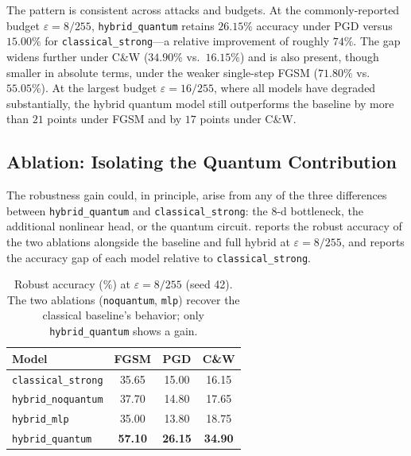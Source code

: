 \documentclass[11pt]{article}
\newcommand{\eps}{\varepsilon}
\begin{document}
The pattern is consistent across attacks and budgets. At the
commonly-reported budget $\eps = 8/255$, \texttt{hybrid\_quantum} retains
$26.15\%$ accuracy under PGD versus $15.00\%$ for
\texttt{classical\_strong}---a relative improvement of roughly $74\%$.
The gap widens further under C\&W ($34.90\%$ vs.\ $16.15\%$) and is also
present, though smaller in absolute terms, under the weaker single-step
FGSM ($71.80\%$ vs.\ $55.05\%$). At the largest budget
$\eps = 16/255$, where all models have degraded substantially, the hybrid
quantum model still outperforms the baseline by more than $21$ points
under FGSM and by $17$ points under C\&W.

\subsection{Ablation: Isolating the Quantum Contribution}
\label{sec:exp:ablation}

The robustness gain could, in principle, arise from any of the three
differences between \texttt{hybrid\_quantum} and
\texttt{classical\_strong}: the 8-d bottleneck, the additional nonlinear
head, or the quantum circuit.  reports the robust
accuracy of the two ablations alongside the baseline and full hybrid at
$\eps = 8/255$, and  reports the accuracy gap
of each model relative to \texttt{classical\_strong}.

\begin{table}[t]
\centering
\caption{Robust accuracy (\%) at $\eps = 8/255$ (seed 42). The two
ablations (\texttt{noquantum}, \texttt{mlp}) recover the classical
baseline's behavior; only \texttt{hybrid\_quantum} shows a gain.}
\label{tab:ablation}
\begin{tabular}{lccc}
\toprule
Model & FGSM & PGD & C\&W \\
\midrule
\texttt{classical\_strong}    & 35.65 & 15.00 & 16.15 \\
\texttt{hybrid\_noquantum}    & 37.70 & 14.80 & 17.65 \\
\texttt{hybrid\_mlp}           & 35.00 & 13.80 & 18.75 \\
\texttt{hybrid\_quantum}       & \textbf{57.10} & \textbf{26.15} & \textbf{34.90} \\
\bottomrule
\end{tabular}
\end{table}
\end{document}
